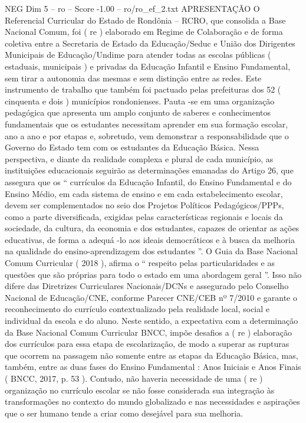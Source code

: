 \begin{textsample}{NEG Dim 5 – ro – Score -1.00 – ro/ro\_ef\_2.txt}  \label{ex:f5_neg_176}
APRESENTAÇÃO O Referencial Curricular do Estado de Rondônia – RCRO, que consolida a Base Nacional Comum, foi ( re ) elaborado em Regime de Colaboração e de forma coletiva entre a Secretaria de Estado da Educação/Seduc e União dos Dirigentes Municipais de Educação/Undime para atender todas as escolas públicas ( estaduais, municipais ) e privadas da Educação Infantil e Ensino Fundamental, sem tirar a autonomia das mesmas e sem distinção entre as redes.
Este instrumento de trabalho que também foi pactuado pelas prefeituras dos 52 ( cinquenta e dois ) municípios rondonienses.
Pauta -se em uma organização pedagógica que apresenta um amplo conjunto de saberes e conhecimentos fundamentais que os estudantes necessitam aprender em sua formação escolar, ano a ano e por etapas e, sobretudo, vem demonstrar a responsabilidade que o Governo do Estado tem com os estudantes da Educação Básica.
Nessa perspectiva, e diante da realidade complexa e plural de cada município, as instituições educacionais seguirão as determinações emanadas do Artigo 26, que assegura que os “ currículos da Educação Infantil, do Ensino Fundamental e do Ensino Médio, em cada sistema de ensino e em cada estabelecimento escolar, devem ser complementados no seio dos Projetos Políticos Pedagógicos/PPPs, como a parte diversificada, exigidas pelas características regionais e locais da sociedade, da cultura, da economia e dos estudantes, capazes de orientar as ações educativas, de forma a adequá -lo aos ideais democráticos e à busca da melhoria na qualidade do ensino-aprendizagem dos estudantes ”.
O Guia da Base Nacional Comum Curricular ( 2018 ), afirma o “ respeito pelas particularidades e as questões que são próprias para todo o estado em uma abordagem geral ”.
Isso não difere das Diretrizes Curriculares Nacionais/DCNs e assegurado pelo Conselho Nacional de Educação/CNE, conforme Parecer CNE/CEB nº 7/2010 e garante o reconhecimento do currículo contextualizado pela realidade local, social e individual da escola e do aluno.
Neste sentido, a expectativa com a determinação da Base Nacional Comum Curricular BNCC, impõe desafios a ( re ) elaboração dos currículos para essa etapa de escolarização, de modo a superar as rupturas que ocorrem na passagem não somente entre as etapas da Educação Básica, mas, também, entre as duas fases do Ensino Fundamental : Anos Iniciais e Anos Finais ( BNCC, 2017, p. 53 ).
Contudo, não haveria necessidade de uma ( re ) organização no currículo escolar se não fosse considerada sua integração às transformações no contexto do mundo globalizado e nas necessidades e aspirações que o ser humano tende a criar como desejável para sua melhoria.

\end{textsample}
